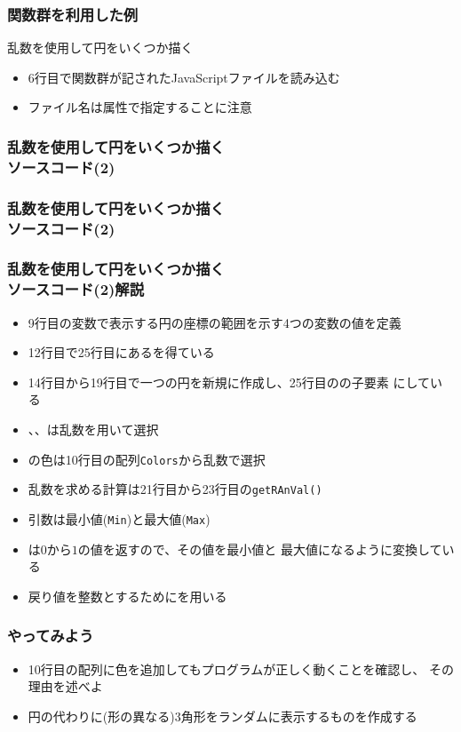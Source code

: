 \begin{frame}[containsverbatim]
 \frametitle{関数群を利用した例}
 乱数を使用して円をいくつか描く
 \begin{itemize}
  \item 6行目で関数群が記されたJavaScriptファイルを読み込む
  \item ファイル名は属性で指定することに注意
 \end{itemize}
\end{frame}
  \begin{frame}[containsverbatim]
   \frametitle{乱数を使用して円をいくつか描く\\ソースコード(2)}
 \end{frame}
  \begin{frame}[containsverbatim]
   \frametitle{乱数を使用して円をいくつか描く\\ソースコード(2)}
 \end{frame}
  \begin{frame}[containsverbatim]
   \frametitle{乱数を使用して円をいくつか描く\\ソースコード(2)解説}
\begin{itemize}
 \item 9行目の変数で表示する円の座標の範囲を示す4つの変数の値を定義
 \item 12行目で25行目にあるを得ている
 \item 14行目から19行目で一つの円を新規に作成し、25行目のの子要素
       にしている
 \item {}、、は乱数を用いて選択
 \item {}の色は10行目の配列\texttt{Colors}から乱数で選択
 \item 乱数を求める計算は21行目から23行目の\texttt{getRAnVal()}
 \item 引数は最小値(\texttt{Min})と最大値(\texttt{Max})
 \item {}は$0$から$1$の値を返すので、その値を最小値と
       最大値になるように変換している
 \item 戻り値を整数とするためにを用いる
\end{itemize}
  \end{frame}
\begin{frame}[containsverbatim]
 \frametitle{やってみよう}
 \begin{itemize}
  \item 10行目の配列に色を追加してもプログラムが正しく動くことを確認し、
        その理由を述べよ
  \item 円の代わりに(形の異なる)3角形をランダムに表示するものを作成する
 \end{itemize}
\end{frame}

\begin{frame}[containsverbatim]
 \frametitle{}
\end{frame}
